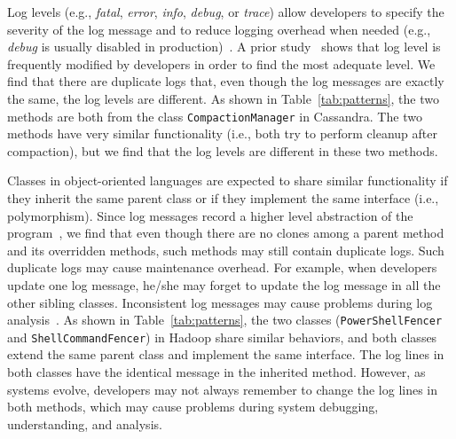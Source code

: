  Log levels (e.g., {\em fatal}, {\em error}, {\em info}, {\em debug}, or {\em trace}) allow developers to specify the severity of the log message and to reduce logging overhead when needed (e.g., {\em debug} is usually disabled in production)~\cite{Li2017}. A prior study~\cite{Yuan:2012:CLP:2337223.2337236} shows that log level is frequently modified by developers in order to find the most adequate level. We find that there are duplicate logs that, even though the log messages are exactly the same, the log levels are different. As shown in Table~\ref{tab:patterns}, the two methods are both from the class {\tt\small CompactionManager} in Cassandra. The two methods have very similar functionality (i.e., both try to perform cleanup after compaction), but we find that the log levels are different in these two methods. 


 Classes in object-oriented languages are expected to share similar functionality if they inherit the same parent class or if they implement the same interface (i.e., polymorphism). Since log messages record a higher level abstraction of the program~\cite{Shang:2014:ULL:2705615.2706065}, we find that even though there are no clones among a parent method and its overridden methods, such methods may still contain duplicate logs. Such duplicate logs may cause maintenance overhead. For example, when developers update one log message, he/she may forget to update the log message in all the other sibling classes. Inconsistent log messages may cause problems during log analysis~\cite{mehran_emse_2018, HADOOP-4190}. As shown in Table~\ref{tab:patterns}, the two classes ({\tt\small PowerShellFencer} and {\tt\small ShellCommandFencer}) in Hadoop share similar behaviors, and both classes extend the same parent class and implement the same interface. The log lines in both classes have the identical message in the inherited method. However, as systems evolve, developers may not always remember to change the log lines in both methods, which may cause problems during system debugging, understanding, and analysis.  







